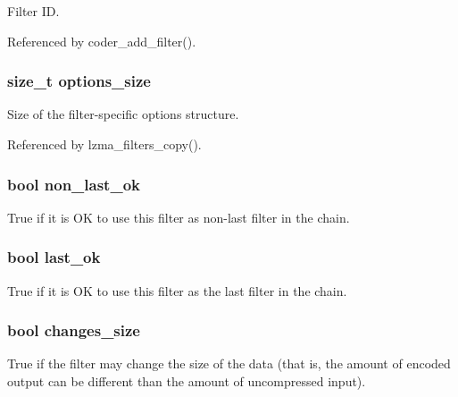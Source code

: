 Filter I\-D. 



Referenced by coder\-\_\-add\-\_\-filter().

\subsubsection[{options\-\_\-size}]{\setlength{\rightskip}{0pt plus 5cm}size\-\_\-t options\-\_\-size}\label{filter__common_8c_ae3be9ce6129a435b24496c57bc8141a6}


Size of the filter-\/specific options structure. 



Referenced by lzma\-\_\-filters\-\_\-copy().

\subsubsection[{non\-\_\-last\-\_\-ok}]{\setlength{\rightskip}{0pt plus 5cm}bool non\-\_\-last\-\_\-ok}\label{filter__common_8c_ad703ac63a7997112bb46bcb488bd83a5}
True if it is O\-K to use this filter as non-\/last filter in the chain. 
\subsubsection[{last\-\_\-ok}]{\setlength{\rightskip}{0pt plus 5cm}bool last\-\_\-ok}\label{filter__common_8c_abccb55bd90f3f71fbeca1ca96f77fa40}
True if it is O\-K to use this filter as the last filter in the chain. 
\subsubsection[{changes\-\_\-size}]{\setlength{\rightskip}{0pt plus 5cm}bool changes\-\_\-size}\label{filter__common_8c_ab49ba4b830db7487db6793b6bae9dc16}
True if the filter may change the size of the data (that is, the amount of encoded output can be different than the amount of uncompressed input). 